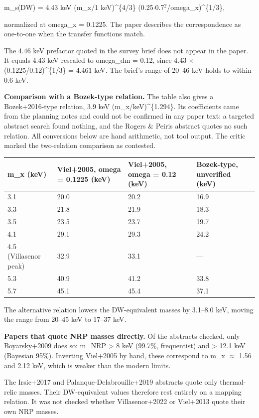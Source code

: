 \documentclass[11pt,a4paper]{article}
\begin{document}
m\_s(DW) = 4.43 keV (m\_x/1 keV)\textasciicircum{}\{4/3\} (0.25$\cdot$0.7$^2$/omega\_x)\textasciicircum{}\{1/3\},

normalized at omega\_x = 0.1225. The paper describes the correspondence as one-to-one when the transfer functions match.

The 4.46 keV prefactor quoted in the survey brief does not appear in the paper. It equals 4.43 keV rescaled to omega\_dm = 0.12, since 4.43 $\times$ (0.1225/0.12)\textasciicircum{}\{1/3\} = 4.461 keV. The brief's range of 20--46 keV holds to within 0.6 keV.

\textbf{Comparison with a Bozek-type relation.} The table also gives a Bozek+2016-type relation, 3.9 keV (m\_x/keV)\textasciicircum{}\{1.294\}. Its coefficients came from the planning notes and could not be confirmed in any paper text: a targeted abstract search found nothing, and the Rogers \& Peiris abstract quotes no such relation. All conversions below are hand arithmetic, not tool output. The critic marked the two-relation comparison as contested.

\begin{longtable}{@{}p{}p{}p{}p{}@{}}
\toprule
\textbf{m\_x (keV)} & \textbf{Viel+2005, omega = 0.1225 (keV)} & \textbf{Viel+2005, omega = 0.12 (keV)} & \textbf{Bozek-type, unverified (keV)} \\ \midrule \endhead
3.1 & 20.0 & 20.2 & 16.9 \\
3.3 & 21.8 & 21.9 & 18.3 \\
3.5 & 23.5 & 23.7 & 19.7 \\
4.1 & 29.1 & 29.3 & 24.2 \\
4.5 (Villasenor peak) & 32.9 & 33.1 & --- \\
5.3 & 40.9 & 41.2 & 33.8 \\
5.7 & 45.1 & 45.4 & 37.1 \\
\bottomrule\end{longtable}
The alternative relation lowers the DW-equivalent masses by 3.1--8.0 keV, moving the range from 20--45 keV to 17--37 keV.

\textbf{Papers that quote NRP masses directly.} Of the abstracts checked, only Boyarsky+2009 does so: m\_NRP \textgreater{} 8 keV (99.7\%, frequentist) and \textgreater{} 12.1 keV (Bayesian 95\%). Inverting Viel+2005 by hand, these correspond to m\_x $\approx$ 1.56 and 2.12 keV, which is weaker than the modern limits.

The Irsic+2017 and Palanque-Delabrouille+2019 abstracts quote only thermal-relic masses. Their DW-equivalent values therefore rest entirely on a mapping relation. It was not checked whether Villasenor+2022 or Viel+2013 quote their own NRP masses.
\end{document}
